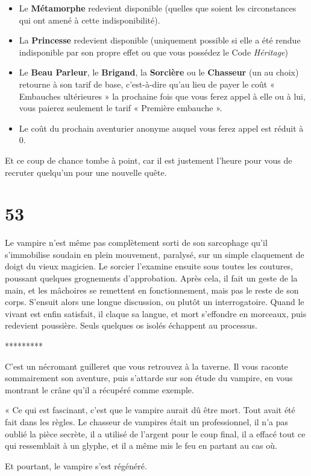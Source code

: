 \documentclass{report}
\newcommand{\gsection}[1]{
    \section{#1}
    \label{section-#1}
}
\newcommand{\ellipse}{
    \begin{center}
        *********
    \end{center}
}
\newcommand{\hero}[1]{\textbf{#1}}
\begin{document}
\begin{itemize}
\item Le \hero{Métamorphe} redevient disponible (quelles que soient les circonstances qui ont amené à cette indisponibilité).
\item La \hero{Princesse} redevient disponible (uniquement possible si elle a été rendue indisponible par son propre effet ou que vous possédez le Code \emph{Héritage})
\item Le \textbf{Beau Parleur}, le \textbf{Brigand}, la \textbf{Sorcière} ou le \textbf{Chasseur} (un au choix) retourne à son tarif de base, c'est-à-dire qu'au lieu de payer le coût « Embauches ultérieures » la prochaine fois que vous ferez appel à elle ou à lui, vous paierez seulement le tarif « Première embauche ».
\item Le coût du prochain aventurier anonyme auquel vous ferez appel est réduit à 0.
\end{itemize}

Et ce coup de chance tombe à point, car il est justement l'heure pour vous de recruter quelqu'un pour une nouvelle quête.

\gsection{53}

Le vampire n'est même pas complètement sorti de son sarcophage qu'il s'immobilise soudain en plein mouvement, paralysé, sur un simple claquement de doigt du vieux magicien. Le sorcier l'examine ensuite sous toutes les coutures, poussant quelques grognements d'approbation. Après cela, il fait un geste de la main, et les mâchoires se remettent en fonctionnement, mais pas le reste de son corps. S'ensuit alors une longue discussion, ou plutôt un interrogatoire. Quand le vivant est enfin satisfait, il claque sa langue, et mort s'effondre en morceaux, puis redevient poussière. Seuls quelques os isolés échappent au processus.

\ellipse

C'est un nécromant guilleret que vous retrouvez à la taverne. Il vous raconte sommairement son aventure, puis s'attarde sur son étude du vampire, en vous montrant le crâne qu'il a récupéré comme exemple.

« Ce qui est fascinant, c'est que le vampire aurait dû être mort. Tout avait été fait dans les règles. Le chasseur de vampires était un professionnel, il n'a pas oublié la pièce secrète, il a utilisé de l'argent pour le coup final, il a effacé tout ce qui ressemblait à un glyphe, et il a même mis le feu en partant au cas où.

Et pourtant, le vampire s'est régénéré.
\end{document}
